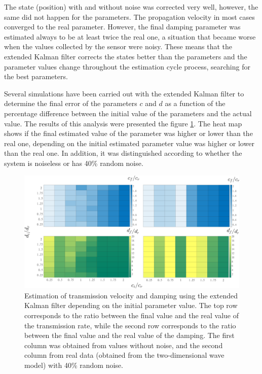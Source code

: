 \documentclass[12pt, a4paper]{article} %
\begin{document}
	The state (position) with and without noise was corrected very well, however, the same did not happen for the parameters. The propagation velocity in most cases converged to the real parameter. However, the final damping parameter was estimated always to be at least twice the real one, a situation that became worse when the values collected by the sensor were noisy. These means that the extended Kalman filter corrects the states better than the parameters and the parameter values change throughout the estimation cycle process, searching for the best parameters.
	\newpage
	
	Several simulations have been carried out with the extended Kalman filter to determine the final error of the parameters $c$ and $d$ as a function of the percentage difference between the initial value of the parameters and the actual value. The results of this analysis were presented the figure \ref{fig:valorescd}. The heat map shows if the final estimated value of the parameter was higher or lower than the real one, depending on the initial estimated parameter value was higher or lower than the real one. In addition, it was distinguished according to whether the system is noiseless or has 40\% random noise.
	
	\begin{figure}[h!]
		\centering
		\includegraphics[width=1\textwidth]{figures/dependencia_valores_iniciales_1.png}
		\caption{Estimation of  transmission velocity and damping using the extended Kalman filter depending on the initial parameter value. The top row corresponds to the ratio between the final value and the real value of the transmission rate, while the second row corresponds to the ratio between the final value and the real value of the damping. The first column was obtained from values without noise, and the second column from real data (obtained from the two-dimensional wave model) with 40\% random noise.}
		\label{fig:valorescd}
	\end{figure}
	
\end{document}
